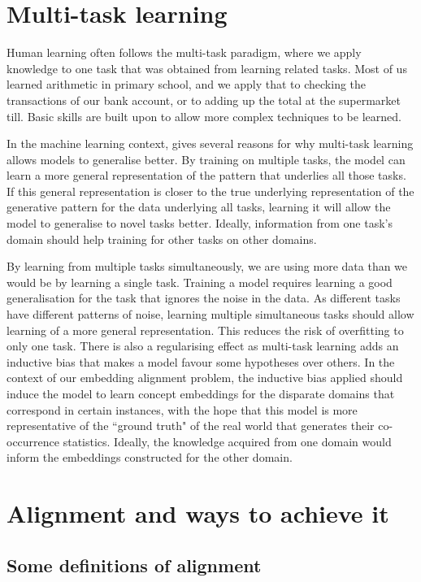 \section{Multi-task learning}

Human learning often follows the multi-task paradigm, where we apply knowledge to one task that was obtained from learning related tasks. Most of us learned arithmetic in primary school, and we apply that to checking the transactions of our bank account, or to adding up the total at the supermarket till. Basic skills are built upon to allow more complex techniques to be learned. 

In the machine learning context, \cite{OverviewMultiTaskLearning} gives several reasons for why multi-task learning allows models to generalise better. By training on multiple tasks, the model can learn a more general representation of the pattern that underlies all those tasks. If this general representation is closer to the true underlying representation of the generative pattern for the data underlying all tasks, learning it will allow the model to generalise to novel tasks better. Ideally, information from one task's domain should help training for other tasks on other domains.

By learning from multiple tasks simultaneously, we are using more data than we would be by learning a single task. Training a model requires learning a good generalisation for the task that ignores the noise in the data. As different tasks have different patterns of noise, learning multiple simultaneous tasks should allow learning of a more general representation. This reduces the risk of overfitting to only one task. There is also a regularising effect as multi-task learning adds an inductive bias that makes a model favour some hypotheses over others. In the context of our embedding alignment problem, the inductive bias applied should induce the model to learn concept embeddings for the disparate domains that correspond in certain instances, with the hope that this model is more representative of the ``ground truth" of the real world that generates their co-occurrence statistics. Ideally, the knowledge acquired from one domain would inform the embeddings constructed for the other domain. 

\newpage
\section{Alignment and ways to achieve it}
    
\subsection{Some definitions of alignment}

